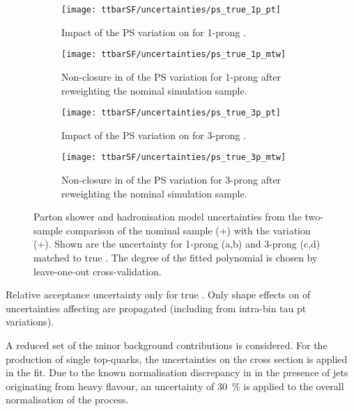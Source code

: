 \begin{figure}[htbp]
  \centering

  \begin{subfigure}[t]{.48\textwidth}
    \texttt{[image: ttbarSF/uncertainties/ps\_true\_1p\_pt]}
    \caption{Impact of the PS variation on \tauhadvis \pT for 1-prong
      \tauhadvis.}
  \end{subfigure}\hfill%
  \begin{subfigure}[t]{.48\textwidth}
    \texttt{[image: ttbarSF/uncertainties/ps\_true\_1p\_mtw]}
    \caption{Non-closure in \mTW of the PS variation for 1-prong
      \tauhadvis after reweighting the nominal simulation sample.}
  \end{subfigure}

  \vspace{0.5em}

  \begin{subfigure}[t]{.48\textwidth}
    \texttt{[image: ttbarSF/uncertainties/ps\_true\_3p\_pt]}
    \caption{Impact of the PS variation on \tauhadvis \pT for 3-prong
      \tauhadvis.}
  \end{subfigure}\hfill%
  \begin{subfigure}[t]{.48\textwidth}
    \texttt{[image: ttbarSF/uncertainties/ps\_true\_3p\_mtw]}
    \caption{Non-closure in \mTW of the PS variation for 3-prong
      \tauhadvis after reweighting the nominal simulation sample.}
  \end{subfigure}

  \caption{Parton shower and hadronisation model uncertainties from
    the two-sample comparison of the nominal sample
    (\POWHEG+\PYTHIA[8]) with the variation
    (\POWHEG+\HERWIG[7]). Shown are the uncertainty for 1-prong (a,b)
    and 3-prong (c,d) \tauhadvis matched to true \tauhad.  The degree
    of the fitted polynomial is chosen by leave-one-out
    cross-validation.}
  \label{fig:ttbarSF_uncertainty_ps}
\end{figure}


Relative acceptance uncertainty only for true \tauhadvis.  Only shape
effects on \mTW of uncertainties affecting \faketauhadvis are
propagated (including from intra-bin tau pt variations).

A reduced set of the minor background contributions is considered. For
the production of single top-quarks, the uncertainties on the cross
section is applied in the fit. Due to the known normalisation
discrepancy in \Vjets in the presence of jets originating from heavy
flavour, an uncertainty of \SI{30}{\percent} is applied to the overall
normalisation of the process.

